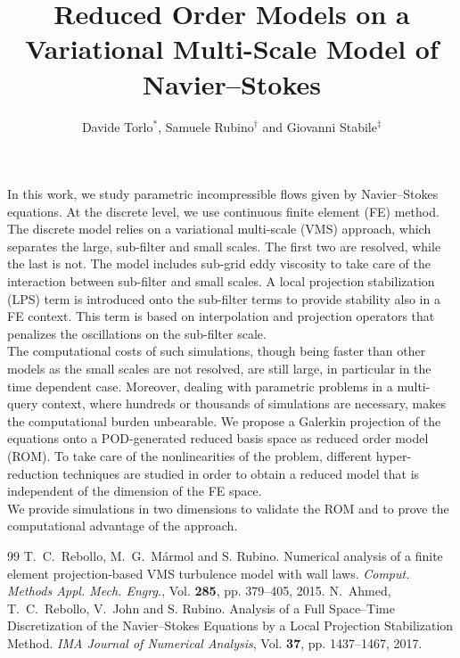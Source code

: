 \documentclass{cfc2023}
\title{Reduced Order Models on a Variational Multi-Scale Model of Navier--Stokes}
\author{Davide Torlo$^{*}$, Samuele Rubino$^{\dag}$ and Giovanni Stabile$^{\ddag}$}
\begin{document}
\thispagestyle{empty}

In this work, we study parametric incompressible flows given by Navier--Stokes equations. At the discrete level, we use continuous finite element (FE) method. 
The discrete model relies on a variational multi-scale (VMS) approach, which separates the large, sub-filter and small scales. 
The first two are resolved, while the last is not. 
The model includes sub-grid eddy viscosity to take care of the interaction between sub-filter and small scales.
A local projection stabilization (LPS) term is introduced onto the sub-filter terms to provide stability also in a FE context. 
This term is based on interpolation and projection operators that penalizes the oscillations on the sub-filter scale\cite{Rebollo15,Ahmed17}.\\
The computational costs of such simulations, though being faster than other models as the small scales are not resolved, are still large, in particular in the time dependent case.
Moreover, dealing with parametric problems in a multi-query context, where hundreds or thousands of simulations are necessary, makes the computational burden unbearable.
We propose a Galerkin projection of the equations onto a POD-generated reduced basis space as reduced order model (ROM).
To take care of the nonlinearities of the problem, different hyper-reduction techniques are studied in order to obtain a reduced model that is independent of the dimension of the FE space. \\
We provide simulations in two dimensions to validate the ROM and to prove the computational advantage of the approach.




\begin{center}
\begin{thebibliography}{99}
 T.~C.~Rebollo, M.~G.~Mármol and S. Rubino. Numerical analysis of a finite element projection-based VMS
turbulence model with wall laws. \emph{Comput. Methods Appl. Mech. Engrg.}, Vol. \textbf{285}, pp. 379--405, 2015.
 N.~Ahmed, T.~C.~Rebollo, V.~John and S. Rubino. Analysis of a Full Space--Time Discretization of the Navier--Stokes Equations by a
Local Projection Stabilization Method. \emph{IMA Journal of Numerical Analysis}, Vol. \textbf{37}, pp. 1437--1467, 2017.
\end{thebibliography}
\end{center}
\end{document}
